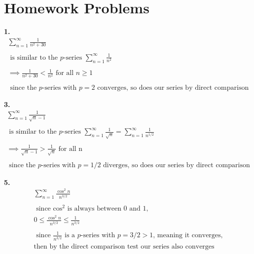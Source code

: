\documentclass{article}
\begin{document}
\newpage

%
%
%
%

\section*{Homework Problems}


\noindent
\textbf{
1.
}
\\
\begin{gather*}
\sum_{n=1}^{\infty} \frac{1}{n^2+30}
\\
\\
\text { is similar to the $p$-series }
\sum_{n=1}^{\infty} \frac{1}{n^2}
\\
\\
\implies \frac{1}{n^2+30}<\frac{1}{n^2}
\text{ for all } n \geq 1
\\
\\
\text{ since the $p$-series with $p=2$ converges, so does our series by direct comparison}
\end{gather*}



\noindent
\textbf{
3.
}
\\
\begin{gather*}
\sum_{n=1}^{\infty} \frac{1}{\sqrt{n}-1}
\\
\\
\text { is similar to the $p$-series }
\sum_{n=1}^{\infty} \frac{1}{\sqrt{n}}=\sum_{n=1}^{\infty} \frac{1}{n^{1/2}}
\\
\\
\implies  \frac{1}{\sqrt{n}-1}>\frac{1}{\sqrt{n}}
\text{ for all n }
\\
\\
\text{ since the $p$-series with $p=1/2$ diverges, so does our series by direct comparison}
\end{gather*}



\noindent
\textbf{
5.
}
\\
\begin{gather*}
\sum_{n=1}^{\infty} \frac{\cos^2 n}{n^{3/2}}
\\
\\
\text{ since $\cos^2$ is always between 0 and 1, }
\\
0 \leq \frac{\cos^2 n}{n^{3/2}} \leq \frac{1}{n^{3/2}}
\\
\\
\text{ since $\frac{1}{n^{3/2}}$ is a $p$-series with $p=3/2>1$, meaning it converges,}
\\
\text{
then by the direct comparison test our series also converges}
\end{gather*}
\end{document}
